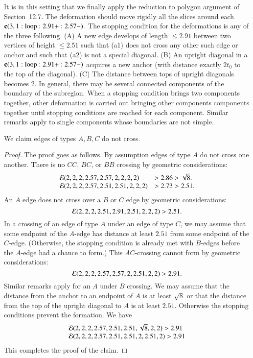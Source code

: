 It is in this setting that we finally apply the reduction to polygon argument of
Section~12.7.  The deformation should move rigidly all the slices around each ${\operatorname{\bf c}}{(3,1:{\operatorname{loop}}:2.91+:2.57-)}$.  
The stopping condition for the deformations is any of the three
following.  (A) A new edge develops of length $\le2.91$ between two vertices
of height $\le 2.51$ such that (a1) does not cross any other such edge or anchor and such that (a2) is not a special diagonal.  (B) An upright diagonal in a ${\operatorname{\bf c}}{(3,1:{\operatorname{loop}}:2.91+:2.57-)}$ acquires a new anchor
(with distance exactly $2t_0$ to the top of the diagonal).  (C) The distance
between tops of upright diagonals becomes $2$.  In general, there
may be several connected components of the boundary of the subregion.
When a stopping condition brings two components together, other deformation is carried out bringing other components components together until stopping
conditions are reached for each component.  Similar remarks apply
to single components whose boundaries are not simple.

\begin{lemma}
We claim edges of types $A,B,C$ do not cross.
\end{lemma}

\begin{proof}
The proof goes as follows.
By assumption edges of type $A$ do not cross one another.
There is no $CC$, $BC$, or $BB$ crossing by geometric considerations:
   $$
   \begin{array}{lll}
   {{\mathcal E}}(2,2,2,2.57,2.57,2,2,2,2) &> 2.86 > \sqrt8.\\
   {{\mathcal E}}(2,2,2,2.57,2.51,2.51,2,2,2) &> 2.73 > 2.51.\\
   \end{array}
   $$
An $A$ edge does not cross over a $B$ or $C$ edge by geometric considerations:
   $$
   {{\mathcal E}}(2,2,2,2.51,2.91,2.51,2,2,2) > 2.51.
   $$
In a crossing of an edge of type $A$ under an edge of type $C$, we
may assume that some endpoint of the $A$-edge has distance at least $2.51$
from some endpoint of the $C$-edge.  (Otherwise, the stopping condition
is already met with $B$-edges before the $A$-edge had a chance to form.)
This $AC$-crossing cannot form by geometric considerations:
   $$
   {{\mathcal E}}(2,2,2,2.57,2.57,2,2.51,2,2) > 2.91.
   $$
Similar remarks apply for an $A$ under $B$ crossing.  We may assume that
the distance from the anchor to an endpoint of $A$ is at least $\sqrt8$
or that the distance from the top of the upright diagonal to $A$ is
at least $2.51$.  Otherwise the stopping conditions prevent the formation.
We have
   $$
   \begin{array}{lll}
   {\mathcal E}(2,2,2,2.57,2.51,2.51,\sqrt8,2,2) > 2.91\\
   {\mathcal E}(2,2,2,2.57,2.51,2.51,2,2.51,2) > 2.91\\
   \end{array}
   $$
This completes the proof of the claim.
\end{proof}

